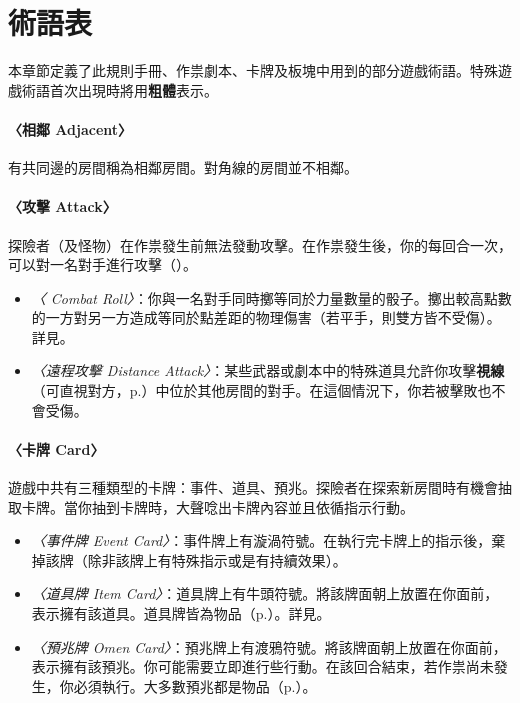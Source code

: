 
\section{術語表} \label{sec:glossary}

本章節定義了此規則手冊、作祟劇本、卡牌及板塊中用到的部分遊戲術語。特殊遊戲術語首次出現時將用\textbf{粗體}表示。

\paragraph{〈相鄰 Adjacent〉}
有共同邊的房間稱為相鄰房間。對角線的房間並不相鄰。

\paragraph{〈攻擊 Attack〉}
探險者（及怪物）在作祟發生前無法發動攻擊。在作祟發生後，你的每回合一次，可以對一名對手進行攻擊（）。

\begin{itemize}
  \item \textit{〈 Combat Roll〉}：你與一名對手同時擲等同於力量數量的骰子。擲出較高點數的一方對另一方造成等同於點差距的物理傷害（若平手，則雙方皆不受傷）。詳見。
  \item \textit{〈遠程攻擊 Distance Attack〉}：某些武器或劇本中的特殊道具允許你攻擊\textbf{視線}（可直視對方，p.\pageref{glossary:line-of-sight}）中位於其他房間的對手。在這個情況下，你若被擊敗也不會受傷。
\end{itemize}

\paragraph{〈卡牌 Card〉}
遊戲中共有三種類型的卡牌：事件、道具、預兆。探險者在探索新房間時有機會抽取卡牌。當你抽到卡牌時，大聲唸出卡牌內容並且依循指示行動。

\begin{itemize}
  \item \textit{〈事件牌 Event Card〉}：事件牌上有漩渦符號\EventSymbol{}。在執行完卡牌上的指示後，棄掉該牌（除非該牌上有特殊指示或是有持續效果）。
  \item \textit{〈道具牌 Item Card〉}：道具牌上有牛頭符號\ItemSymbol{}。將該牌面朝上放置在你面前，表示擁有該道具。道具牌皆為物品（p.\pageref{glossary:item}）。詳見。
  \item \textit{〈預兆牌 Omen Card〉}：預兆牌上有渡鴉符號\OmenSymbol{}。將該牌面朝上放置在你面前，表示擁有該預兆。你可能需要立即進行些行動。在該回合結束，若作祟尚未發生，你必須執行。大多數預兆都是物品（p.\pageref{glossary:item}）。
\end{itemize}

